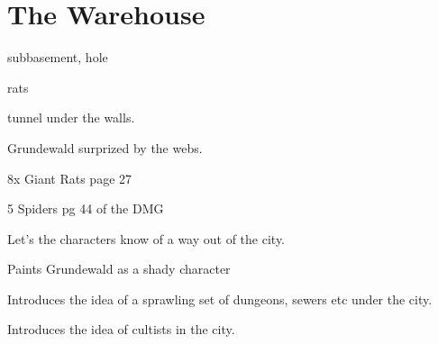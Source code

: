 \documentclass[a4paper]{dnd5}
\begin{document}
\section*{The Warehouse}

\begin{precis}
\item  subbasement, hole
\item  rats
\item  tunnel under the walls. 
\item Grundewald surprized by the webs.
\item 8x Giant Rats page 27
\item 5 Spiders pg 44 of the DMG
\end{precis}


\begin{outs} 
\item 
\item 
\end{outs}

\begin{purpose}
\item Let's the characters know of a way out of the city.
\item Paints Grundewald as a shady character
\item Introduces the idea of a sprawling set of dungeons, sewers etc under the city.
\item Introduces the idea of cultists in the city.
\end{purpose}
     
\end{document}
